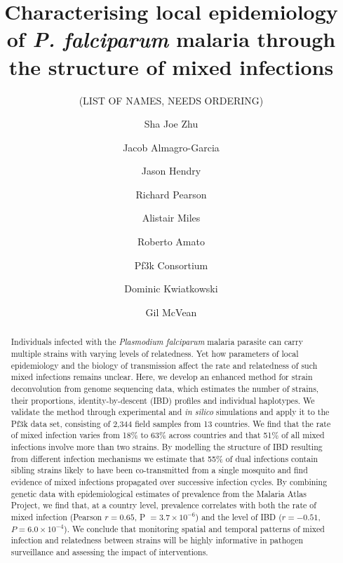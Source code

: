 \documentclass[9pt,lineno]{elife}
\newcounter{todocounter}
\newcommand{\done}[2][]
{\todo[color=green!40, #1]{#2}}
\newcommand{\donenum}[2][]
{\stepcounter{todocounter}\done[#1]{\thetodocounter: #2}}
\begin{document}
\title{Characterising local epidemiology of {\it P. falciparum} malaria through the structure of mixed infections}
\newcommand\shorttitle{Mixed infections in malaria}
\date{}

\author[?]{(LIST OF NAMES, NEEDS ORDERING)}
\author[1]{Sha Joe Zhu}
\author[1,2,3,4]{Jacob Almagro-Garcia}
\author[1]{Jason Hendry}
\author[2,3]{Richard Pearson}
\author[2,3]{Alistair Miles}
\author[2,3]{Roberto Amato}
\author[?]{Pf3k Consortium}
\author[2,3]{Dominic Kwiatkowski}
\author[1,3]{Gil McVean}



\maketitle{}

\begin{abstract}
Individuals infected with the {\it Plasmodium falciparum} malaria parasite can carry multiple strains with varying levels of relatedness. Yet how parameters of local epidemiology and the biology of transmission affect the rate and relatedness of such mixed infections remains unclear.  Here, we develop an enhanced method for strain deconvolution from genome sequencing data, which estimates the number of strains, their proportions, identity-by-descent (IBD) profiles and individual haplotypes.  We validate the method through experimental and {\em in silico} simulations and apply it to the Pf3k data set, consisting of 2,344 field samples from 13 countries.  We find that the rate of mixed infection varies from 18\% to 63\% across countries and that 51\% of all mixed infections involve more than two strains.  By modelling the structure of IBD resulting from different infection mechanisms we estimate that 55\% of dual infections contain sibling strains likely to have been co-transmitted from a single mosquito and find evidence of mixed infections propagated over successive infection cycles.  By combining genetic data with epidemiological estimates of prevalence from the Malaria Atlas Project, we find that, at a country level, prevalence correlates with both the rate of mixed infection (Pearson $r = 0.65$, P $= 3.7 \times 10^{-6}$) and the level of IBD ($r = -0.51$, $P = 6.0 \times 10^{-4}$).  We conclude that monitoring spatial and temporal patterns of mixed infection and relatedness between strains will be highly informative in pathogen surveillance and assessing the impact of interventions.
\end{abstract}
\end{document}
